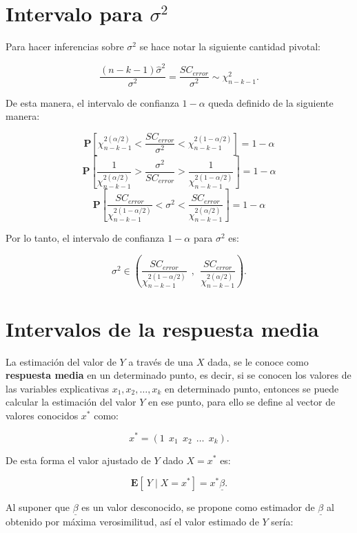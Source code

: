 \documentclass[
  a4paper,
  oneside,
  openany]{book}
\begin{document}
\hypertarget{intervalo-para-sigma2-1}{%
\section{\texorpdfstring{Intervalo para \(\sigma^2\)}{Intervalo para \textbackslash sigma\^{}2}}\label{intervalo-para-sigma2-1}}

Para hacer inferencias sobre \(\sigma^2\) se hace notar la siguiente cantidad pivotal:

\[\frac{(n-k-1)\hat{\sigma}^2}{\sigma^2}=\frac{SC_{error}}{\sigma^2} \sim \chi^2_{n-k-1}.\]

De esta manera, el intervalo de confianza \(1-\alpha\) queda definido de la siguiente manera:

\[\mathbf{P}\left[ \chi^{2(\alpha/2)}_{n-k-1}<\frac{SC_{error}}{\sigma^2}<\chi^{2(1-\alpha/2)}_{n-k-1}\right]=1-\alpha\]
\[\mathbf{P}\left[ \frac{1}{\chi^{2(\alpha/2)}_{n-k-1}}>\frac{\sigma^2}{SC_{error}}>\frac{1}{\chi^{2(1-\alpha/2)}_{n-k-1}}\right]=1-\alpha\]
\[\mathbf{P}\left[ \frac{SC_{error}}{\chi^{2(1-\alpha/2)}_{n-k-1}}<\sigma^2<\frac{SC_{error}}{\chi^{2(\alpha/2)}_{n-k-1}}\right]=1-\alpha\]

Por lo tanto, el intervalo de confianza \(1-\alpha\) para \(\sigma^2\) es:

\[\sigma^2 \in \left(\frac{SC_{error}}{\chi^{2(1-\alpha/2)}_{n-k-1}}\ \ , \ \ \frac{SC_{error}}{\chi^{2(\alpha/2)}_{n-k-1}}\right).\]

\hypertarget{intervalos-de-la-respuesta-media}{%
\section{Intervalos de la respuesta media}\label{intervalos-de-la-respuesta-media}}

La estimación del valor de \(Y\) a través de una \(X\) dada, se le conoce como \textbf{respuesta media} en un determinado punto, es decir, si se conocen los valores de las variables explicativas \(x_{1},x_{2}, \ldots , x_{k}\) en determinado punto, entonces se puede calcular la estimación del valor \(Y\) en ese punto, para ello se define al vector de valores conocidos \(x^*\) como:

\[x^*= \left( 1 \ \ x_{1} \ \ x_{2} \ \ \ldots \ \ x_{k}\right).\]

De esta forma el valor ajustado de \(Y\) dado \(X=x^*\) es:

\[\mathbf{E}[ \ Y \mid X=x^*]=x^*\underline{\beta}.\]

Al suponer que \(\underline{\beta}\) es un valor desconocido, se propone como estimador de \(\underline{\beta}\) al obtenido por máxima verosimilitud, así el valor estimado de \(Y\) sería:
\end{document}
